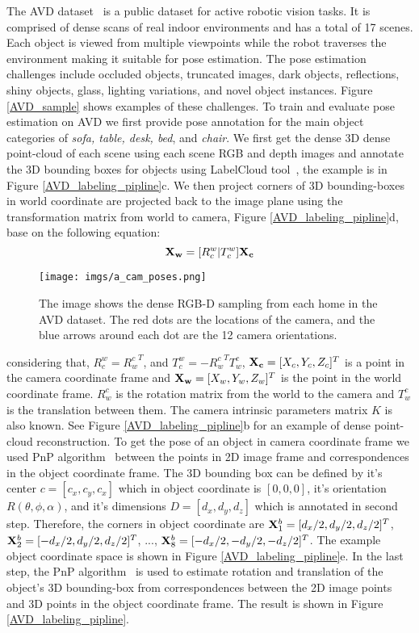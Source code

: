 \documentclass[letterpaper, 10 pt, conference]{ieeeconf}  \pdfoutput=1
\begin{document}
The AVD dataset~\cite{Ammirato2017ADF} is a public dataset for active robotic vision tasks. It is comprised of dense scans of real indoor environments and has a total of 17 scenes. 
Each object is viewed from multiple viewpoints while the robot traverses the environment making it suitable for pose estimation. The pose estimation challenges include occluded objects, truncated images, dark objects, reflections, shiny objects, glass, lighting variations, and novel object instances. Figure \ref{AVD_sample} shows examples of these challenges. 
To train and evaluate pose estimation on AVD we
first provide pose annotation for the main object categories of {\em sofa, table, desk, bed}, and {\em chair}.
We first get the dense 3D dense point-cloud of each scene using each scene RGB and depth images and annotate the 3D bounding boxes for objects using 
LabelCloud tool~\cite{Sager2021labelCloudAL}, the example is in Figure \ref{AVD_labeling_pipline}c.
We then project corners of 3D bounding-boxes in world coordinate are projected back to the image plane using the transformation matrix from world to camera, Figure \ref{AVD_labeling_pipline}d, base on the following equation: $$ 
{\bf X_w}  = [R_c^w|T_c^w] {\bf X_c}
$$
\begin{figure}[htbp]
\begin{center}
\texttt{[image: imgs/a\_cam\_poses.png]}
\end{center}
   \caption{The image shows the dense RGB-D sampling from each home in the AVD dataset. The red dots are the locations of the camera, and the blue arrows around each dot are the 12 camera orientations.}
\label{vew_AVD}
\end{figure}
considering that, $R_c^w = {R_w^c}^T$, and $T_c^w = {-R_w^c}^{T} T_w^c$, ${\bf X_c} = [X_{c}, Y_{c}, Z_{c}]^T$ is a point in the camera coordinate frame and ${\bf X_w} = [X_w, Y_w, Z_w] ^T$ is the point in the world coordinate frame. $R_w^c$ is the rotation matrix from the world to the camera and $T_w^c$ is the translation between them. The camera intrinsic parameters matrix $K$ is also known. See Figure \ref{AVD_labeling_pipline}b for an example of dense point-cloud reconstruction. 
To get the pose of an object in camera coordinate frame we used PnP algorithm~\cite{Lepetit2008EPnPAA} between the points in 2D image frame and correspondences in the object coordinate frame. The 3D bounding box can be defined by it's center $c = [c_x,c_y,c_x]$ which in object coordinate is $[0,0,0]$, it's orientation $R(\theta, \phi, \alpha )$, and it's dimensions $D = [d_x,d_y,d_z]$ which is annotated in second step. Therefore, the corners in object coordinate are ${\bf X}_1^b = [ d_x/2, d_y/2,d_z/2]^T$, ${\bf X}_2^b = [ - d_x/2, d_y/2,d_z/2]^T$, $...$, ${\bf X}_8^b = [ - d_x/2, -d_y/2,-d_z/2]^T$. The example object coordinate space is shown in Figure \ref{AVD_labeling_pipline}e.
In the last step, the PnP algorithm~\cite{Lepetit2008EPnPAA} is used to estimate rotation and translation of the object's 3D bounding-box from correspondences between the 2D image points and 3D points in the object coordinate frame. The result is shown in Figure \ref{AVD_labeling_pipline}.
\end{document}
